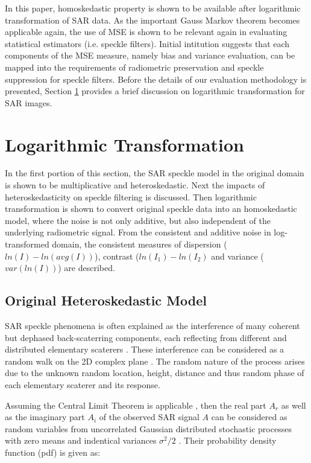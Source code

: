 \documentclass[journal]{IEEEtran}
\begin{document}
In this paper, homoskedastic property is shown to be available after logarithmic transformation of SAR data.
As the important Gauss Markov theorem becomes applicable again, 
	the use of MSE is shown to be relevant again in evaluating statistical estimators (i.e. speckle filters).
Initial intitution suggests that each components of the MSE measure, 
	namely bias and variance evaluation, can be mapped into 
	the requirements of radiometric preservation and speckle suppression for speckle filters.
Before the details of our evaluation methodology is presented, 
	Section \ref{sec:log_transform} provides a brief discussion on logarithmic transformation for SAR images.

\section{Logarithmic Transformation}
\label{sec:log_transform}

In the first portion of this section,
    the SAR speckle model in the original domain is shown to be multiplicative and heteroskedastic.
Next the impacts of heteroskedasticity on speckle filtering is discussed.
Then logarithmic transformation is shown to convert original speckle data into an homoskedastic model, where the noise is not only additive, but also independent of the underlying radiometric signal.
From the consistent and additive noise in log-transformed domain,
    the consistent measures of dispersion ($ln(I)-ln(avg(I))$), contrast ($ln(I_1)-ln(I_2)$ and variance ($var(ln(I))$) are described.

\subsection{Original Heteroskedastic Model}

SAR speckle phenomena is often explained as the interference of many coherent but dephased back-scaterring components, each reflecting from different and distributed elementary scaterers \cite{Oliver_ProcIEEE_1963, Leith_ProcIEEE_1971}. These interference can be considered as a random walk on the 2D complex plane \cite{Goodman_JOptSocAm_76}.  The random nature of the process arises due to the unknown random location, height, distance and thus random phase of each elementary scaterer and its response.

Assuming the Central Limit Theorem is applicable \cite{Goodman_Springer_1975}, then the real part $A_r$ as well as the imaginary part $A_i$ of the observed SAR signal $A$ can be considered as random variables from uncorrelated Gaussian distributed stochastic processes with zero means and indentical variances $\sigma^2/2$  \cite{Lee_CRCPress_2009}. Their probability density function (pdf) is given as:
\end{document}
